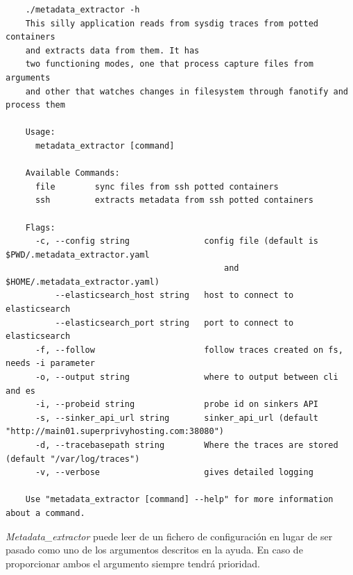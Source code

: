 \begin{verbatim}
    ./metadata_extractor -h
    This silly application reads from sysdig traces from potted containers 
    and extracts data from them. It has
    two functioning modes, one that process capture files from arguments 
    and other that watches changes in filesystem through fanotify and process them
    
    Usage:
      metadata_extractor [command]
    
    Available Commands:
      file        sync files from ssh potted containers
      ssh         extracts metadata from ssh potted containers
    
    Flags:
      -c, --config string               config file (default is $PWD/.metadata_extractor.yaml 
                                            and $HOME/.metadata_extractor.yaml)
          --elasticsearch_host string   host to connect to elasticsearch
          --elasticsearch_port string   port to connect to elasticsearch
      -f, --follow                      follow traces created on fs, needs -i parameter
      -o, --output string               where to output between cli and es
      -i, --probeid string              probe id on sinkers API
      -s, --sinker_api_url string       sinker_api_url (default "http://main01.superprivyhosting.com:38080")
      -d, --tracebasepath string        Where the traces are stored  (default "/var/log/traces")
      -v, --verbose                     gives detailed logging
    
    Use "metadata_extractor [command] --help" for more information about a command.
\end{verbatim}
\bigskip
\emph{Metadata\_extractor} puede leer de un fichero de configuración en lugar de ser pasado como uno de los argumentos descritos en la ayuda. En caso
de proporcionar ambos el argumento siempre tendrá prioridad.






